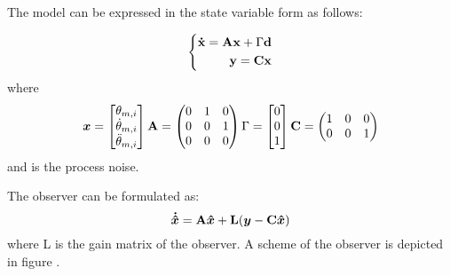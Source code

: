 The model can be expressed in the state variable form as follows:
%

\begin{equation}
\left \{
\begin{aligned}
\DIFdelbegin %
\DIFdelend \DIFaddbegin \vect{\dot{x}}\DIFaddend =\vectm{A}\DIFdelbegin %
\DIFdelend \DIFaddbegin \vect{x} \DIFaddend + \vectmm{\Gamma}\DIFdelbegin %
\DIFdelend \DIFaddbegin \vect{d} \DIFaddend \\
\DIFdelbegin %
\DIFdelend \DIFaddbegin \vect{y}\DIFaddend =\vectm{C}\DIFdelbegin %
\DIFdelend \DIFaddbegin \vect{x}
\DIFaddend \end{aligned}
\right .
\end{equation}
%
where
%
\begin{equation}
\begin{aligned}
{ \boldsymbol {x}}=\begin{bmatrix}  {\theta_{m,i}} \\ \dot{\theta}_{m,i} \\ \ddot{\theta}_{m,i} \end{bmatrix}
\mathbf{A}=\begin{pmatrix} 0 & 1 & 0  \\
	0 & 0 & 1 \\
	0 & 0 & 0  \end{pmatrix}
{\Gamma }=\begin{bmatrix}  0 \\ 0 \\ 1 \end{bmatrix}
\mathbf{C}=\begin{pmatrix} 1 & 0 & 0  \\
	0 & 0 & 1 \end{pmatrix} 
\end{aligned}
\end{equation}
%
and \DIFdelbegin {}\DIFdelend \DIFaddbegin {}\DIFaddend is the process noise.

The observer can be formulated as:
%
\begin{equation}
{ \boldsymbol {\dot{\hat{x}}}}=\mathbf{A}{ \boldsymbol {\hat{x}}}+\mathbf{L}({ \boldsymbol {y}}-\mathbf{C}{ \boldsymbol {\hat{x}}})
\end{equation}
%
where L is the gain matrix of the observer. A scheme of the observer is depicted in figure \DIFdelbegin \DIFdel{(\ref{fig:block_acc_observer})}\DIFdelend \DIFaddbegin \DIFadd{\ref{fig:acc_estimation}}\DIFaddend . 
%
\DIFdelbegin %
{%
}
\DIFdelend %

